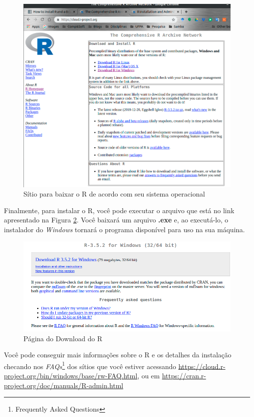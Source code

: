 \documentclass[12pt,a4paper,oneside]{erdc}
\begin{document}
\begin{figure}[htpb]
	\centering
	\includegraphics[width=\linewidth]{../figs/BP_Curso_TecComp_00_2019_f01-03}
	\caption{Sítio para baixar o R de acordo com seu sistema operacional}
	\label{fig:f01-03}
\end{figure}


Finalmente, para instalar o R, você pode executar o arquivo que está no link apresentado na Figura \ref{fig:f01-04}. Você baixará um arquivo \textbf{.exe} e, ao executá-lo, o instalador do \textit{Windows} tornará o programa disponível para uso na sua máquina. 

\begin{figure}[htpb]
	\centering
	\includegraphics[width=\linewidth]{../figs/BP_Curso_TecComp_00_2019_f01-04}
	\caption{Página do Download do R}
	\label{fig:f01-04}
\end{figure}


Você pode conseguir mais informações sobre o R e os detalhes da instalação checando nos \textit{FAQs}\footnote{Frequently Asked Questions} dos sítios que você estiver acessando \url{https://cloud.r-project.org/bin/windows/base/rw-FAQ.html}, ou em \url{https://cran.r-project.org/doc/manuals/R-admin.html}
\end{document}
